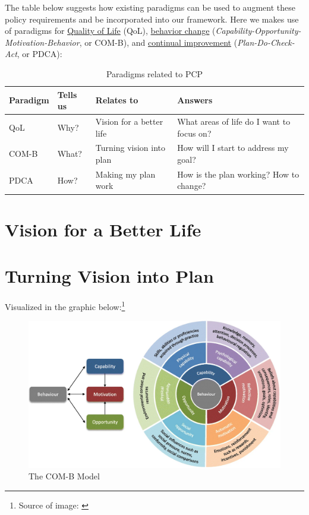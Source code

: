 \documentclass[
]{book}
\begin{document}
The table below suggests how existing paradigms can be used to augment these policy requirements and be incorporated into our framework. Here we makes use of paradigms for \protect\hyperlink{qol_intro}{Quality of Life} (QoL), \protect\hyperlink{comb_intro}{behavior change} (\emph{Capability-Opportunity-Motivation-Behavior}, or COM-B), and \protect\hyperlink{pdca_intro}{continual improvement} (\emph{Plan-Do-Check-Act}, or PDCA):

\begin{table}

\caption{\label{tab:unnamed-chunk-3}Paradigms related to PCP}
\centering
\begin{tabular}[t]{l|l|l|l}
\hline
Paradigm & Tells us & Relates to & Answers\\
\hline
QoL & Why? & Vision for a better life & What areas of life do I want to focus on?\\
\hline
COM-B & What? & Turning vision into plan & How will I start to address my goal?\\
\hline
PDCA & How? & Making my plan work & How is the plan working? How to change?\\
\hline
\end{tabular}
\end{table}

\hypertarget{qol_intro}{%
\section{Vision for a Better Life}\label{qol_intro}}

\hypertarget{comb_intro}{%
\section{Turning Vision into Plan}\label{comb_intro}}

Visualized in the graphic below:\footnote{Source of image: \citet{comb-pic}}

\begin{figure}
\includegraphics[width=31.3in]{_bookdown_files/img/com-b} \caption{The COM-B Model}\label{fig:unnamed-chunk-4}
\end{figure}
\end{document}
